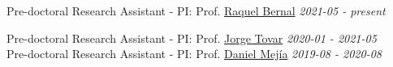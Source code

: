 \documentclass[margin,line]{res}
\begin{document}
\begin{resume}
\vspace{-.2cm}
{Pre-doctoral Research Assistant - PI: Prof. \href{https://sites.google.com/view/raquelbernal}{Raquel Bernal}} \hfill \emph{2021-05 - present} \\
	
\vspace{-.4cm}

{Pre-doctoral Research Assistant - PI: Prof. \href{https://sites.google.com/view/jorgetovar/home}{Jorge Tovar}} \hfill \emph{2020-01 - 2021-05} \\

\vspace{-.4cm}
{Pre-doctoral Research Assistant - PI: Prof. \href{https://sites.google.com/view/danielmejial}{Daniel Mejía}} \hfill \emph{2019-08 - 2020-08} \\




\end{resume}
\end{document}
